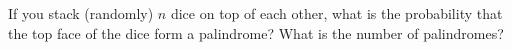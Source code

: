   If you stack (randomly) $n$ dice on top of each other,
  what is the probability that the top face of the dice form a palindrome?
  What is the number of palindromes?
